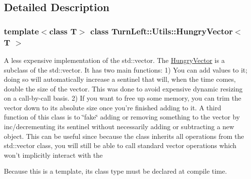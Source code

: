 \subsection{Detailed Description}
\subsubsection*{template$<$class T$>$ class TurnLeft::Utils::HungryVector$<$ T $>$}

A less expensive implementation of the std::vector. The \hyperlink{classTurnLeft_1_1Utils_1_1HungryVector}{HungryVector} is a subclass of the std::vector. It has two main functions: 1) You can add values to it; doing so will automatically increase a sentinel that will, when the time comes, double the size of the vector. This was done to avoid expensive dynamic resizing on a call-\/by-\/call basis. 2) If you want to free up some memory, you can trim the vector down to its absolute size once you're finished adding to it. A third function of this class is to \char`\"{}fake\char`\"{} adding or removing something to the vector by inc/decrementing its sentinel without necessarily adding or subtracting a new object. This can be useful since because the class inherits all operations from the std::vector class, you will still be able to call standard vector operations which won't implicitly interact with the

Because this is a template, its class type must be declared at compile time. 

